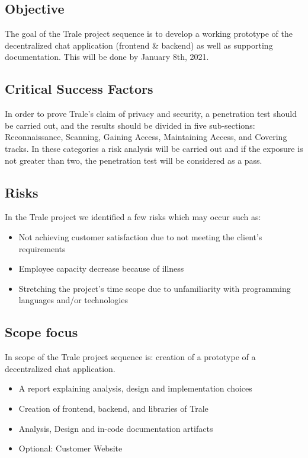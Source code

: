 \subsection{Objective}\label{subsec:objective}

The goal of the Trale project sequence is to develop a working prototype of the decentralized chat application
(frontend \& backend) as well as supporting documentation.
This will be done by January 8th, 2021.

\subsection{Critical Success Factors}\label{subsec:critical-success-factors}

In order to prove Trale's claim of privacy and security, a penetration test should be carried out, and the
results should be divided in five sub-sections: Reconnaissance, Scanning, Gaining Access, Maintaining Access, and
Covering tracks.
In these categories a risk analysis will be carried out and if the exposure is not greater than two, the penetration
test will be considered as a pass.

\subsection{Risks}\label{subsec:risks}

In the Trale project we identified a few risks which may occur such as:

\begin{itemize}
    \setlength\itemsep{-0.5em}
    \item Not achieving customer satisfaction due to not meeting the client's requirements
    \item Employee capacity decrease because of illness
    \item Stretching the project's time scope due to unfamiliarity with programming languages and/or technologies
\end{itemize}

\subsection{Scope focus}\label{subsec:scope-focus}

In scope of the Trale project sequence is:
creation of a prototype of a decentralized chat application.

\begin{itemize}
    \setlength\itemsep{-0.5em}
    \item A report explaining analysis, design and implementation choices
    \item Creation of frontend, backend, and libraries of Trale
    \item Analysis, Design and in-code documentation artifacts
    \item Optional: Customer Website
\end{itemize}

